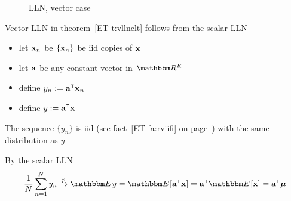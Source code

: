 \begin{frame}

    \vspace{2em}
    \begin{figure}
       \begin{center}
        \caption{\label{f:vector_mean} LLN, vector case}
       \end{center}
    \end{figure}

\end{frame}

\begin{frame}

    \vspace{2em}
    Vector LLN in theorem~\ref{ET-t:vllnclt} follows from the scalar LLN 
    
    \begin{itemize}
        \item let ${\mathbf x}_n$ be $\{{\mathbf x}_n\}$ be {\sc
        iid} copies of ${\mathbf x}$
        \item let ${\mathbf a}$ be any
    constant vector in $\RR^K$
        \item define $y_n := \bolda^\T \boldx_n$
        \item define $y := \bolda^\T \boldx$
    \end{itemize}
    
    The sequence $\{y_n\}$ is {\sc iid}
    (see fact~\ref{ET-fa:rviifi} on page~\pageref{ET-fa:rviifi})
    with the same distribution as $y$
    
    By the scalar LLN
    \begin{equation*}
        \frac{1}{N} \sum_{n=1}^N y_n \toprob \EE y 
        = \EE[\bolda^\T \boldx]
        = \bolda^\T\EE[ \boldx]
        = \bolda^\T \boldmu
    \end{equation*}
    
\end{frame}

